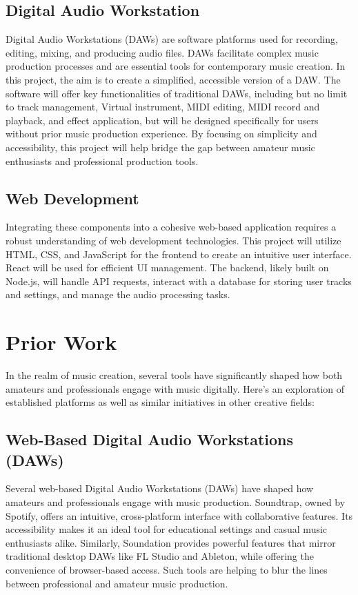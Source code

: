 \documentclass[10pt,twocolumn]{article}
\begin{document}
\subsection{Digital Audio Workstation}
Digital Audio Workstations (DAWs) are software platforms used for recording, editing, mixing, and producing audio files. DAWs facilitate complex music production processes and are essential tools for contemporary music creation. In this project, the aim is to create a simplified, accessible version of a DAW. The software will offer key functionalities of traditional DAWs, including but no limit to track management, Virtual instrument, MIDI editing, MIDI record and playback, and effect application, but will be designed specifically for users without prior music production experience. By focusing on simplicity and accessibility, this project will help bridge the gap between amateur music enthusiasts and professional production tools.
\subsection{Web Development}
Integrating these components into a cohesive web-based application requires a robust understanding of web development technologies. This project will utilize HTML, CSS, and JavaScript for the frontend to create an intuitive user interface. React will be used for efficient UI management. The backend, likely built on Node.js, will handle API requests, interact with a database for storing user tracks and settings, and manage the audio processing tasks. 
\section{Prior Work}
In the realm of music creation, several tools have significantly shaped how both amateurs and professionals engage with music digitally. Here’s an exploration of established platforms as well as similar initiatives in other creative fields:
\subsection{Web-Based Digital Audio Workstations (DAWs)}
Several web-based Digital Audio Workstations (DAWs) have shaped how amateurs and professionals engage with music production. Soundtrap, owned by Spotify, offers an intuitive, cross-platform interface with collaborative features. Its accessibility makes it an ideal tool for educational settings and casual music enthusiasts alike. Similarly, Soundation provides powerful features that mirror traditional desktop DAWs like FL Studio and Ableton, while offering the convenience of browser-based access. Such tools are helping to blur the lines between professional and amateur music production.
\end{document}
